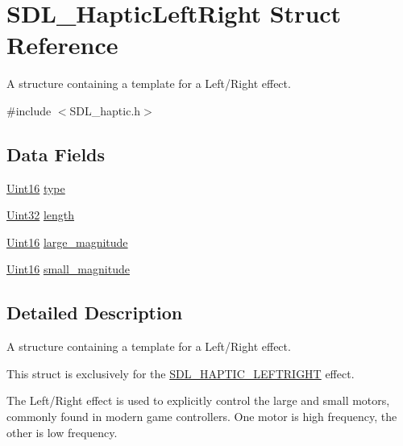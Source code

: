 \hypertarget{struct_s_d_l___haptic_left_right}{}\section{S\+D\+L\+\_\+\+Haptic\+Left\+Right Struct Reference}
\label{struct_s_d_l___haptic_left_right}


A structure containing a template for a Left/\+Right effect.  




{\ttfamily \#include $<$S\+D\+L\+\_\+haptic.\+h$>$}

\subsection*{Data Fields}
\begin{DoxyCompactItemize}
\item 
\hyperlink{_s_d_l__stdinc_8h_a31fcc0a076c9068668173ee26d33e42b}{Uint16} \hyperlink{struct_s_d_l___haptic_left_right_a8db4a3e9f29940892f2773bca31c74e1}{type}
\item 
\hyperlink{_s_d_l__stdinc_8h_add440eff171ea5f55cb00c4a9ab8672d}{Uint32} \hyperlink{struct_s_d_l___haptic_left_right_afbde362d49894774c8b9c9e85ac0a913}{length}
\item 
\hyperlink{_s_d_l__stdinc_8h_a31fcc0a076c9068668173ee26d33e42b}{Uint16} \hyperlink{struct_s_d_l___haptic_left_right_a7ddbab8f75202e09f535a9fa6217f129}{large\+\_\+magnitude}
\item 
\hyperlink{_s_d_l__stdinc_8h_a31fcc0a076c9068668173ee26d33e42b}{Uint16} \hyperlink{struct_s_d_l___haptic_left_right_a801da1244b77fa4181c5cd5e77553031}{small\+\_\+magnitude}
\end{DoxyCompactItemize}


\subsection{Detailed Description}
A structure containing a template for a Left/\+Right effect. 

This struct is exclusively for the \hyperlink{_s_d_l__haptic_8h_ae047624d8458ff6400887c37a36f86d3}{S\+D\+L\+\_\+\+H\+A\+P\+T\+I\+C\+\_\+\+L\+E\+F\+T\+R\+I\+G\+HT} effect.

The Left/\+Right effect is used to explicitly control the large and small motors, commonly found in modern game controllers. One motor is high frequency, the other is low frequency.

